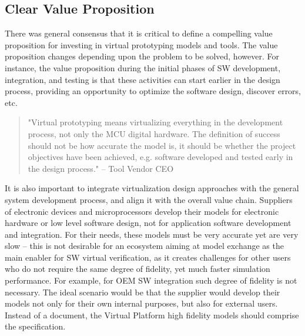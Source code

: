 
\subsection{Clear Value Proposition}
There was general consensus that it is critical to define a compelling value proposition for investing in virtual prototyping models and tools.
The value proposition changes depending upon the problem to be solved, however.
For instance, the value proposition during the initial phases of SW development, integration, and testing is that these activities can start earlier in the design process, providing an opportunity to optimize the software design, discover errors, etc.

\begin{quote}
"Virtual prototyping means virtualizing everything in the development process, not only the MCU digital hardware.
The definition of success should not be how accurate the model is,
it should be whether the project objectives have been achieved, e.g. software developed and tested early in the design process."
-- Tool Vendor CEO
\end{quote}

It is also important to integrate virtualization design approaches with the general system development process, and align it with the overall value chain.
Suppliers of electronic devices and microprocessors develop their models for electronic hardware or low level software design, not for application software development and integration.
For their needs, these models must be very accurate yet are very slow -- this is not desirable for an ecosystem aiming at model exchange as the main enabler for SW virtual verification,
as it creates challenges for other users who do not require the same degree of fidelity, yet much faster simulation performance.
For example, for OEM SW integration such degree of fidelity is not necessary. 
The ideal scenario would be that the supplier would develop their models not only for their own internal purposes, but also for external users.
Instead of a document,
the Virtual Platform high fidelity models should comprise the specification. 

